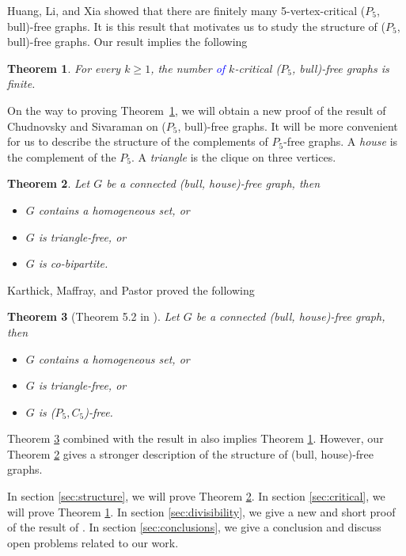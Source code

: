 \documentclass[a4paper,11pt]{article}
\newtheorem{theorem}{Theorem}[section]
\theoremstyle{case}
\begin{document}
Huang, Li, and Xia \cite{HuaLi2023b} showed that there are finitely many 5-vertex-critical ($P_5$, bull)-free graphs. It is this result that motivates us to study the structure of ($P_5$, bull)-free graphs. Our result implies the following

\begin{theorem}\label{thm:critical}
    For every $k \geq 1$, the number \textcolor{blue}{of} $k$-critical ($P_5$, bull)-free graphs is finite. 
\end{theorem}

On the way to proving Theorem~\ref{thm:critical}, we will obtain a new proof of the result of Chudnovsky and Sivaraman on ($P_5$, bull)-free graphs. It will be more convenient for us to describe the structure of the complements of $P_5$-free graphs.  A {\it house} is the complement of the $P_5$. A {\it triangle} is the clique on three vertices. 


\begin{theorem}\label{thm:(bull,house)-free}
    Let $G$ be a connected (bull, house)-free graph, then
    \begin{itemize}[noitemsep, topsep=0pt]
        \item[$(i)$] $G$ contains a homogeneous set, or
        \item[$(ii)$] $G$ is triangle-free, or
        \item[$(iii)$] $G$ is co-bipartite.
    \end{itemize}
\end{theorem}

Karthick, Maffray, and Pastor \cite{KarMaf2019} proved the following
\begin{theorem}[Theorem 5.2 in \cite{KarMaf2019}]\label{thm:KarMaf}
    Let $G$ be a connected (bull, house)-free graph, then
    \begin{itemize}[noitemsep, topsep=0pt]
        \item[$(i)$] $G$ contains a homogeneous set, or
        \item[$(ii)$] $G$ is triangle-free, or
        \item[$(iii)$] $G$ is ($P_5, C_5$)-free.
    \end{itemize}
\end{theorem}
Theorem \ref{thm:KarMaf} combined with the result in \cite{ChvHoa1987} also implies Theorem \ref{thm:critical}. However, our Theorem \ref{thm:(bull,house)-free} gives a stronger description of the structure of (bull, house)-free graphs.

In section \ref{sec:structure}, we will prove Theorem \ref{thm:(bull,house)-free}. In section \ref{sec:critical}, 
we will prove Theorem \ref{thm:critical}. In section \ref{sec:divisibility}, we give a new and short proof of the result of \cite{ChuSiv2019}. In section \ref{sec:conclusions}, we give a conclusion and discuss open problems related to our work.  
\end{document}
